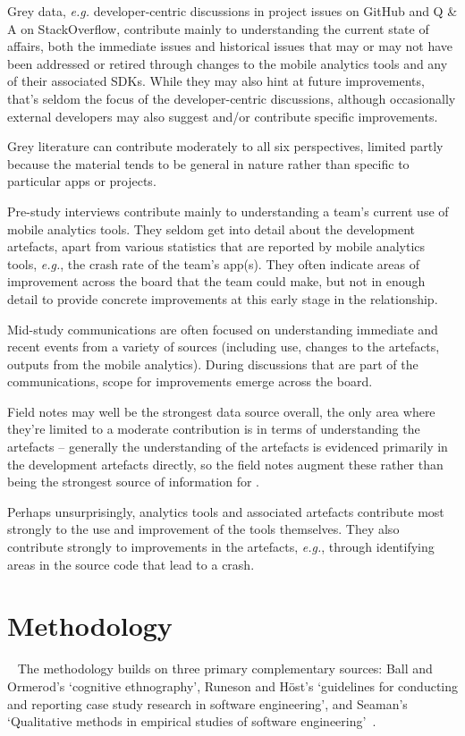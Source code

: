 Grey data, \textit{e.g.} developer-centric discussions in project issues on GitHub and Q \& A on StackOverflow, contribute mainly to understanding the current state of affairs, both the immediate issues and historical issues that may or may not have been addressed or retired through changes to the mobile analytics tools and any of their associated SDKs. While they may also hint at future improvements, that's seldom the focus of the developer-centric discussions, although occasionally external developers may also suggest and/or contribute specific improvements.

Grey literature can contribute moderately to all six perspectives, limited partly because the material tends to be general in nature rather than specific to particular apps or projects.

Pre-study interviews contribute mainly to understanding a team's current use of mobile analytics tools. They seldom get into detail about the development artefacts, apart from various statistics that are reported by mobile analytics tools, \textit{e.g.}, the crash rate of the team's app(s). They often indicate areas of improvement across the board that the team could make, but not in enough detail to provide concrete improvements at this early stage in the relationship.

Mid-study communications are often focused on understanding immediate and recent events from a variety of sources (including use, changes to the artefacts, outputs from the mobile analytics). During discussions that are part of the communications, scope for improvements emerge across the board.

Field notes may well be the strongest data source overall, the only area where they're limited to a moderate contribution is in terms of understanding the artefacts -- generally the understanding of the artefacts is evidenced primarily in the development artefacts directly, so the field notes augment these rather than being the strongest source of information for \uartefacts.

Perhaps unsurprisingly, analytics tools and associated artefacts contribute most strongly to the use and improvement of the tools themselves. They also contribute strongly to improvements in the artefacts, \textit{e.g.}, through identifying areas in the source code that lead to a crash.


\section{Methodology}~\label{methodology-methodology-section}
The methodology builds on three primary complementary sources: Ball and Ormerod's `cognitive ethnography', Runeson and Höst's `guidelines for conducting and reporting case study research in software engineering', and Seaman's `Qualitative methods in empirical studies of software engineering'~.

